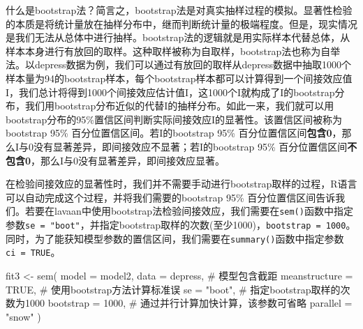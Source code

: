 \documentclass[
  chinese-hans,
  letterpaper,
  DIV=11,
  numbers=noendperiod]{scrartcl}
\newenvironment{Shaded}{\begin{snugshade}}{\end{snugshade}}
\newcommand{\AttributeTok}[1]{\textcolor[rgb]{0.40,0.45,0.13}{#1}}
\newcommand{\CommentTok}[1]{\textcolor[rgb]{0.37,0.37,0.37}{#1}}
\newcommand{\ConstantTok}[1]{\textcolor[rgb]{0.56,0.35,0.01}{#1}}
\newcommand{\DecValTok}[1]{\textcolor[rgb]{0.68,0.00,0.00}{#1}}
\newcommand{\FunctionTok}[1]{\textcolor[rgb]{0.28,0.35,0.67}{#1}}
\newcommand{\NormalTok}[1]{\textcolor[rgb]{0.00,0.23,0.31}{#1}}
\newcommand{\OtherTok}[1]{\textcolor[rgb]{0.00,0.23,0.31}{#1}}
\newcommand{\StringTok}[1]{\textcolor[rgb]{0.13,0.47,0.30}{#1}}
\begin{document}
什么是bootstrap法？简言之，bootstrap法是对真实抽样过程的模拟。显著性检验的本质是将统计量放在抽样分布中，继而判断统计量的极端程度。但是，现实情况是我们无法从总体中进行抽样。bootstrap法的逻辑就是用实际样本代替总体，从样本本身进行{有放回的}取样。这种取样被称为自取样，bootstrap法也称为自举法。以depress数据为例，我们可以通过有放回的取样从depress数据中抽取1000个样本量为94的bootstrap样本，每个bootstrap样本都可以计算得到一个间接效应值I，我们总计将得到1000个间接效应估计值I，这1000个I就构成了I的bootstrap分布，我们用bootstrap分布近似的代替I的抽样分布。如此一来，我们就可以用bootstrap分布的95\%置信区间判断实际间接效应I的显著性。该置信区间被称为bootstrap
95\% 百分位置信区间。若I的bootstrap 95\%
百分位置信区间\textbf{包含0}，那么I与0没有显著差异，即间接效应不显著；若I的bootstrap
95\%
百分位置信区间\textbf{不包含0}，那么I与0没有显著差异，即间接效应显著。

在检验间接效应的显著性时，我们并不需要手动进行bootstrap取样的过程，R语言可以自动完成这个过程，并将我们需要的bootstrap
95\%
百分位置信区间告诉我们。若要在lavaan中使用bootstrap法检验间接效应，我们需要在\texttt{sem()}函数中指定参数\texttt{se\ =\ "boot"}，并指定bootstrap取样的次数(至少1000)，\texttt{bootstrap\ =\ 1000}。同时，为了能获知模型参数的置信区间，我们需要在\texttt{summary()}函数中指定参数\texttt{ci\ =\ TRUE}。

\begin{Shaded}
\begin{Highlighting}[numbers=left,,]
\NormalTok{fit3 }\OtherTok{\textless{}{-}} \FunctionTok{sem}\NormalTok{(}
  \AttributeTok{model =}\NormalTok{ model2,}
  \AttributeTok{data =}\NormalTok{ depress,}
  \CommentTok{\# 模型包含截距}
  \AttributeTok{meanstructure =} \ConstantTok{TRUE}\NormalTok{,}
  \CommentTok{\# 使用bootstrap方法计算标准误}
  \AttributeTok{se =} \StringTok{"boot"}\NormalTok{,}
  \CommentTok{\# 指定bootstrap取样的次数为1000}
  \AttributeTok{bootstrap =} \DecValTok{1000}\NormalTok{,}
  \CommentTok{\# 通过并行计算加快计算，该参数可省略}
  \AttributeTok{parallel =} \StringTok{"snow"}
\NormalTok{)}
\end{Highlighting}
\end{Shaded}
\end{document}
